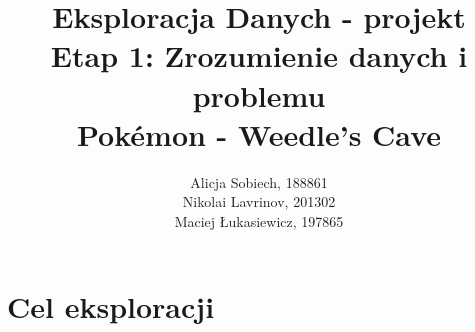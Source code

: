 \documentclass[12pt, a4paper]{report}
\begin{document}
\title{
  \Huge \textbf{Eksploracja Danych - projekt} 
  \\ \vspace{5pt} 
  \LARGE  Etap 1: Zrozumienie danych i problemu
  \\ \vspace{10pt} 
  \Large  Pokémon - Weedle's Cave
}

\author{Alicja Sobiech, 188861\\
Nikolai Lavrinov, 201302\\
Maciej Łukasiewicz, 197865}


\maketitle


\tableofcontents

\renewcommand{\arraystretch}{1.2}


\newpage
{}

\section{Cel eksploracji} 
\end{document}
